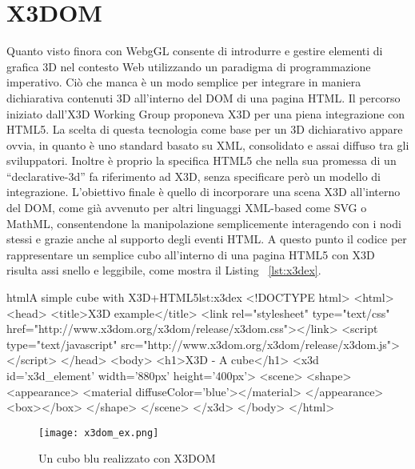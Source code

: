 \section{X3DOM}
Quanto visto finora con WebgGL consente di introdurre e gestire elementi di grafica 3D nel contesto Web utilizzando un paradigma di programmazione imperativo. Ciò che manca è un modo semplice per integrare in maniera dichiarativa contenuti 3D all'interno del DOM di una pagina HTML. Il percorso iniziato dall'X3D Working Group proponeva X3D per una piena integrazione con HTML5. La scelta di questa tecnologia come base per un 3D dichiarativo appare ovvia, in quanto è uno standard basato su XML, consolidato e assai diffuso tra gli sviluppatori. Inoltre è proprio la specifica HTML5 che nella sua promessa di un ``declarative-3d'' fa riferimento ad X3D, senza specificare però un modello di integrazione. L'obiettivo finale è quello di incorporare una scena X3D all'interno del DOM, come già avvenuto per altri linguaggi XML-based come SVG o MathML, consentendone la manipolazione semplicemente interagendo con i nodi stessi e grazie anche al supporto degli eventi HTML. A questo punto il codice per rappresentare un semplice cubo all'interno di una pagina HTML5 con X3D risulta assi snello e leggibile, come mostra il Listing ~\ref{lst:x3dex}.

\begin{mylisting}{html}{A simple cube with X3D+HTML5}{lst:x3dex}
<!DOCTYPE html>
<html>
<head>
<title>X3D example</title>
<link rel="stylesheet" type="text/css" href="http://www.x3dom.org/x3dom/release/x3dom.css"></link>
<script type="text/javascript" src="http://www.x3dom.org/x3dom/release/x3dom.js"></script>
</head>
<body>
    <h1>X3D - A cube</h1>
    <x3d id='x3d_element' width='880px' height='400px'>
        <scene>
            <shape>
                <appearance>
                    <material diffuseColor='blue'></material>
                </appearance>
                <box></box>
            </shape>
        </scene>
    </x3d>
</body>
</html>
\end{mylisting}

\begin{figure}[Ht]
\centering
\texttt{[image: x3dom\_ex.png]}
\caption{Un cubo blu realizzato con X3DOM}
\label{label:x3domex}
\end{figure}

